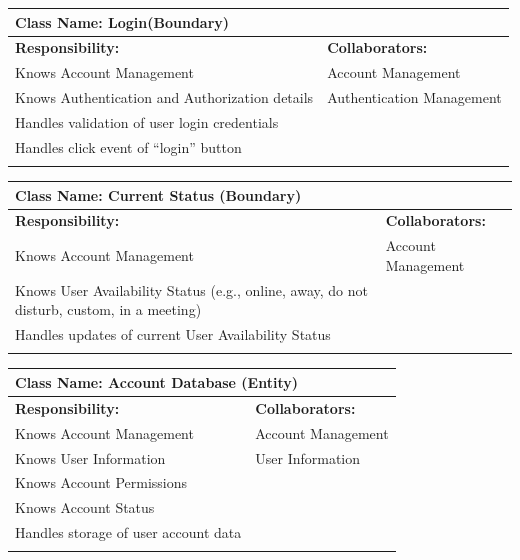 \documentclass[]{article}
\begin{document}
\begin{itemize}
	\begin{table}[ht]
		\centering
		\begin{tabular}{|p{7cm}|p{7cm}|}
		\hline 
		 \multicolumn{2}{|l|}{\textbf{Class Name:} Login(Boundary)} \\
		\hline
		\textbf{Responsibility:} & \textbf{Collaborators:} \\
		\hline
			Knows Account Management & Account Management\\
			Knows Authentication and Authorization details & Authentication Management\\
			Handles validation of user login credentials &\\
			Handles click event of “login” button &\\
		\vspace{0.1in} & \\
		\hline
		\end{tabular}
	\end{table}

	\begin{table}[ht]
		\centering
		\begin{tabular}{|p{7cm}|p{7cm}|}
		\hline 
		 \multicolumn{2}{|l|}{\textbf{Class Name:} Current Status (Boundary)} \\
		\hline
		\textbf{Responsibility:} & \textbf{Collaborators:} \\
		\hline
			Knows Account Management & Account Management \\
			Knows User Availability Status (e.g., online, away, do not disturb, custom, in a meeting) &\\
			Handles updates of current User Availability Status &\\
		\vspace{0.1in} & \\
		\hline
		\end{tabular}
	\end{table}

	\begin{table}[ht]
		\centering
		\begin{tabular}{|p{7cm}|p{7cm}|}
		\hline 
		 \multicolumn{2}{|l|}{\textbf{Class Name:} Account Database (Entity)} \\
		\hline
		\textbf{Responsibility:} & \textbf{Collaborators:} \\
		\hline
			Knows Account Management & Account Management \\
			Knows User Information & User Information \\
			Knows Account Permissions &\\
			Knows Account Status &\\
			Handles storage of user account data &\\
		\vspace{0.1in} & \\
		\hline
		\end{tabular}
	\end{table}


\end{itemize}
\end{document}
